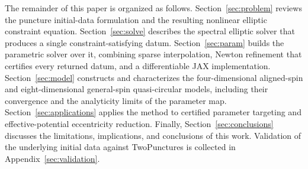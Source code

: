 \documentclass[
  aps,
  prd,
  twocolumn,
  amsmath,
  amssymb,
  nofootinbib,
  superscriptaddress,
  floatfix,
]{revtex4-2}
\begin{document}
The remainder of this paper is organized as follows.
Section~\ref{sec:problem} reviews the puncture initial-data formulation and the resulting nonlinear elliptic constraint equation.
Section~\ref{sec:solve} describes the spectral elliptic solver that produces a single constraint-satisfying datum.
Section~\ref{sec:param} builds the parametric solver over it, combining sparse interpolation, Newton refinement that certifies every returned datum, and a differentiable JAX implementation.
Section~\ref{sec:model} constructs and characterizes the four-dimensional aligned-spin and eight-dimensional general-spin quasi-circular models, including their convergence and the analyticity limits of the parameter map.
Section~\ref{sec:applications} applies the method to certified parameter targeting and effective-potential eccentricity reduction.
Finally, Section~\ref{sec:conclusions} discusses the limitations, implications, and conclusions of this work.
Validation of the underlying initial data against TwoPunctures is collected in Appendix~\ref{sec:validation}.





\end{document}
